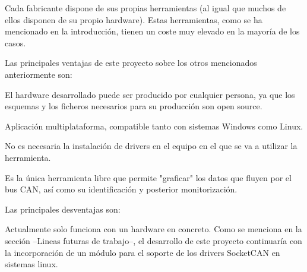 
Cada fabricante dispone de sus propias herramientas (al igual que muchos de ellos disponen de su propio hardware). Estas herramientas, como se ha mencionado en la introducción, tienen un coste muy elevado en la mayoría de los casos.


Las principales ventajas de este proyecto sobre los otros mencionados anteriormente son:

El hardware desarrollado puede ser producido por cualquier persona, ya que los esquemas y los ficheros necesarios para su producción son open source.

Aplicación multiplataforma, compatible tanto con sistemas Windows como Linux.

No es necesaria la instalación de drivers en el equipo en el que se va a utilizar la herramienta.

Es la única herramienta libre que permite "graficar" los datos que fluyen por el bus CAN, así como su identificación y posterior monitorización.


Las principales desventajas son:

Actualmente solo funciona con un hardware en concreto. Como se menciona en la sección --Lineas futuras de trabajo--, el desarrollo de este proyecto continuaría con la incorporación de un módulo para el soporte de los drivers SocketCAN en sistemas linux.